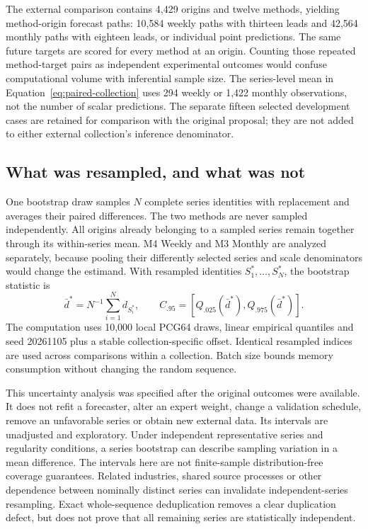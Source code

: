 

The external comparison contains 4,429 origins and twelve methods, yielding
\externalpathcount{} method-origin forecast paths: 10,584 weekly paths with thirteen leads and
42,564 monthly paths with eighteen leads, or \externalpointcount{} individual point predictions. The same future targets
are scored for every method at an origin. Counting those repeated method-target
pairs as independent experimental outcomes would confuse computational volume
with inferential sample size. The series-level mean in
Equation~\ref{eq:paired-collection} uses 294 weekly or 1,422 monthly observations,
not the number of scalar predictions. The separate fifteen selected development
cases are retained for comparison with the original proposal; they are not
added to either external collection's inference denominator.

\subsection{What was resampled, and what was not}
\label{sec:paired-resampling}

One bootstrap draw samples $N$ complete series identities with replacement and
averages their paired differences. The two methods are never sampled
independently. All origins already belonging to a sampled series remain
together through its within-series mean. M4 Weekly and M3 Monthly are analyzed
separately, because pooling their differently selected series and scale
denominators would change the estimand. With resampled identities
$S_1^*,\ldots,S_N^*$, the bootstrap statistic is
\begin{equation}
 \bar d^*=N^{-1}\sum_{i=1}^N d_{S_i^*},\qquad
 C_{.95}=[Q_{.025}(\bar d^*),Q_{.975}(\bar d^*)].
 \label{eq:paired-bootstrap}
\end{equation}
The computation uses 10,000 local PCG64 draws, linear empirical quantiles and
seed 20261105 plus a stable collection-specific offset. Identical resampled
indices are used across comparisons within a collection. Batch size bounds
memory consumption without changing the random sequence.

This uncertainty analysis was specified after the original outcomes were
available. It does not refit a forecaster, alter an expert weight, change a
validation schedule, remove an unfavorable series or obtain new external
data. Its intervals are unadjusted and exploratory. Under independent
representative series and regularity conditions, a series bootstrap can
describe sampling variation in a mean difference. The intervals here are not
finite-sample distribution-free coverage guarantees. Related industries,
shared source processes or other dependence between nominally distinct series
can invalidate independent-series resampling. Exact whole-sequence
deduplication removes a clear duplication defect, but does not prove that all
remaining series are statistically independent.

